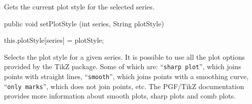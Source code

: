 \begin{tabb}
   Gets the current plot style for the selected series.
\end{tabb}
\begin{htmlonly}
\end{htmlonly}
\begin{code}

   public void setPlotStyle (int series, String plotStyle) \begin{hide} {
      this.plotStyle[series] = plotStyle;
   }\end{hide}
\end{code}
\begin{tabb}
   Selects the plot style for a given series. It is possible to use all the
   plot options provided by the TikZ package. Some of which are:
   ``\texttt{sharp plot}'', which joins points with straight lines,
   ``\texttt{smooth}'', which joins points with a smoothing curve,
   ``\texttt{only marks}'', which does not join points, etc.
   The PGF/TikZ documentation provides more information about smooth plots,
     sharp plots and comb plots.
\end{tabb}
\begin{htmlonly}
\end{htmlonly}
